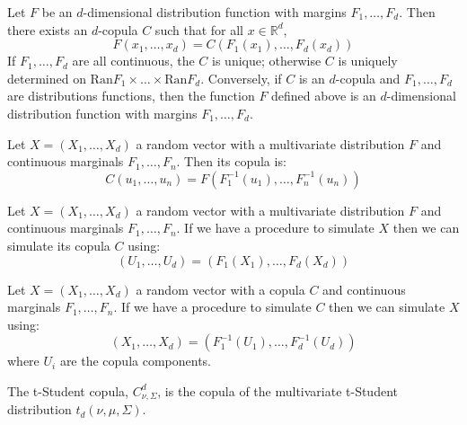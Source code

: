 \documentclass[11pt,fleqn]{book} %
\begin{document}
\begin{theorem}
Let $F$ be an $d$-dimensional distribution function with margins $F_1,\dots,F_d$.
Then there exists an $d$-copula $C$ such that for all $x \in \mathbb{R}^d$,
\begin{displaymath}
F(x_1,\dots,x_d) = C(F_1(x_1),\dots,F_d(x_d))
\end{displaymath}
If $F_1,\dots,F_d$ are all continuous, the $C$ is unique; otherwise $C$ is uniquely
determined on $\textrm{Ran}F_1 \times \dots \times \textrm{Ran}F_d$.
Conversely, if $C$ is an $d$-copula and $F_1,\dots,F_d$ are distributions functions,
then the function $F$ defined above is an $d$-dimensional distribution function
with margins $F_1,\dots,F_d$.
\end{theorem}


\begin{corollary}
Let $X=(X_1, \dots, X_d)$ a random vector with a multivariate 
distribution $F$ and continuous marginals $F_1, \dots, F_n$. 
Then its copula is:
\begin{displaymath}
C(u_1,\dots,u_n) = F(F_1^{-1}(u_1), \dots, F_n^{-1}(u_n))
\end{displaymath}
\end{corollary}


\begin{corollary}
Let $X=(X_1, \dots, X_d)$ a random vector with a multivariate 
distribution $F$ and continuous marginals $F_1, \dots, F_n$.
If we have a procedure to simulate $X$ then we can simulate 
its copula $C$ using:
\begin{displaymath}
(U_1, \dots, U_d) = (F_1(X_1), \dots, F_d(X_d))
\end{displaymath}
\end{corollary}


\begin{corollary}
Let $X=(X_1, \dots, X_d)$ a random vector with a copula $C$
and continuous marginals $F_1, \dots, F_n$. If we have a
procedure to simulate $C$ then we can simulate $X$ using:
\begin{displaymath}
(X_1, \dots, X_d) = (F_1^{-1}(U_1), \dots, F_d^{-1}(U_d))
\end{displaymath}
where $U_i$ are the copula components.
\end{corollary}


\begin{definition}
The t-Student copula, $C_{\nu,\Sigma}^d$, is the copula of the multivariate 
t-Student distribution $t_d(\nu,\mu,\Sigma)$.
\end{definition}
\end{document}
